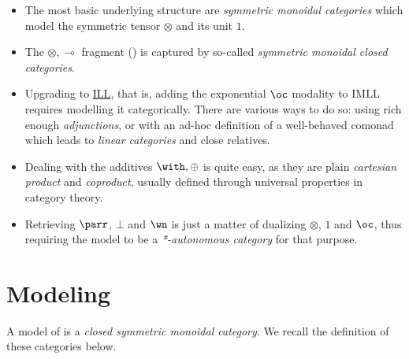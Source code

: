 \begin{itemize}
\item The most basic underlying structure are \emph{symmetric monoidal
  categories} which model the symmetric tensor \(\otimes\) and its unit
  \(1\).
\item The \(\otimes, \multimap\) fragment () is captured by
  so-called \emph{symmetric monoidal closed categories}.
\item Upgrading to \hyperref[intuitionistic-linear-logic]{ILL}, that is, adding the exponential \(\oc\)
  modality to IMLL requires modelling it categorically. There are
  various ways to do so: using rich enough \emph{adjunctions}, or with
  an ad-hoc definition of a well-behaved comonad which leads to
  \emph{linear categories} and close relatives.
\item Dealing with the additives \(\with, \oplus\) is quite easy, as they
  are plain \emph{cartesian product} and \emph{coproduct}, usually
  defined through universal properties in category theory.
\item Retrieving \(\parr\), \(\bot\) and \(\wn\) is just a matter of
  dualizing \(\otimes\), \(1\) and \(\oc\), thus requiring the model to
  be a \emph{*-autonomous category} for that purpose.
\end{itemize}

\section{\texorpdfstring{Modeling }{Modeling IMLL}}\label{modeling-imll}

A model of  is a \emph{closed symmetric monoidal category}. We
recall the definition of these categories below.

